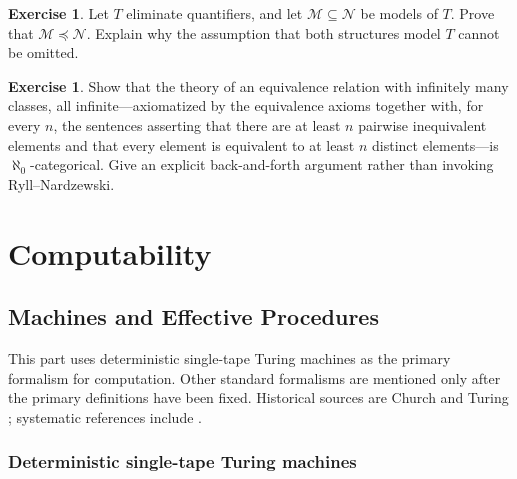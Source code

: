 \documentclass[11pt,oneside,openany]{book}
\theoremstyle{definition}
\newtheorem{exercise}[definition]{Exercise}
\theoremstyle{plain}
\theoremstyle{remark}
\begin{document}
\begin{exercise}
\label{ex:qe-categoricity-02}
Let \(T\) eliminate quantifiers, and let \(\mathcal M\subseteq\mathcal N\) be
models of \(T\).  Prove that \(\mathcal M\preccurlyeq\mathcal N\).  Explain
why the assumption that both structures model \(T\) cannot be omitted.
\end{exercise}

\begin{exercise}
\label{ex:qe-categoricity-03}
\label{ex:back-and-forth-equivalence}
Show that the theory of an equivalence relation with infinitely many
classes, all infinite---axiomatized by the equivalence axioms together with,
for every \(n\), the sentences asserting that there are at least \(n\)
pairwise inequivalent elements and that every element is equivalent to at
least \(n\) distinct elements---is
\(\aleph_0\)-categorical.  Give an explicit back-and-forth argument
rather than invoking Ryll--Nardzewski.
\end{exercise}

\part{Computability}
\label{part:computability}

\chapter{Machines and Effective Procedures}
\label{ch:turing-machines}

This part uses deterministic single-tape Turing machines as the primary
formalism for computation.  Other standard formalisms are mentioned only
after the primary definitions have been fixed.  Historical sources are Church and Turing
\cite{Church1936,Turing1937}; systematic references include
\cite{Shoenfield1967,BoolosBurgessJeffrey2007}.

\section{Deterministic single-tape Turing machines}
\label{sec:turing-machines-01}
\end{document}
